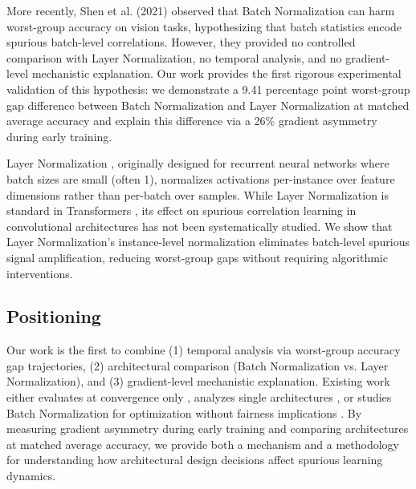 More recently, Shen et al. (2021) \cite{shen2021towards} observed that Batch Normalization can harm worst-group accuracy on vision tasks, hypothesizing that batch statistics encode spurious batch-level correlations. However, they provided no controlled comparison with Layer Normalization, no temporal analysis, and no gradient-level mechanistic explanation. Our work provides the first rigorous experimental validation of this hypothesis: we demonstrate a 9.41 percentage point worst-group gap difference between Batch Normalization and Layer Normalization at matched average accuracy and explain this difference via a 26\% gradient asymmetry during early training.

Layer Normalization \cite{ba2016layer}, originally designed for recurrent neural networks where batch sizes are small (often 1), normalizes activations per-instance over feature dimensions rather than per-batch over samples. While Layer Normalization is standard in Transformers \cite{vaswani2017attention}, its effect on spurious correlation learning in convolutional architectures has not been systematically studied. We show that Layer Normalization's instance-level normalization eliminates batch-level spurious signal amplification, reducing worst-group gaps without requiring algorithmic interventions.

\subsection{Positioning}

Our work is the first to combine (1) temporal analysis via worst-group accuracy gap trajectories, (2) architectural comparison (Batch Normalization vs. Layer Normalization), and (3) gradient-level mechanistic explanation. Existing work either evaluates at convergence only \cite{sagawa2020distributionally}, analyzes single architectures \cite{toneva2018empirical}, or studies Batch Normalization for optimization without fairness implications \cite{santurkar2018does}. By measuring gradient asymmetry during early training and comparing architectures at matched average accuracy, we provide both a mechanism and a methodology for understanding how architectural design decisions affect spurious learning dynamics.
